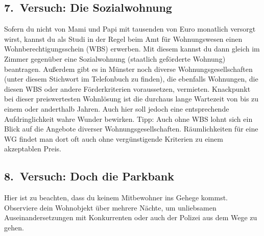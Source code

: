 \begin{multicols*}{2}
\subsection*{7.\ Versuch: Die Sozialwohnung}
Sofern du nicht von Mami und Papi mit tausenden von Euro monatlich versorgt wirst, kannst du als Studi in der Regel beim Amt für Wohnungswesen einen Wohnberechtigungsschein (WBS) erwerben. Mit diesem kannst du dann gleich im Zimmer gegenüber eine Sozialwohnung (staatlich geförderte Wohnung) beantragen. Außerdem gibt es in Münster noch diverse Wohnungsgesellschaften (unter diesem Stichwort im Telefonbuch zu finden), die ebenfalls Wohnungen, die diesen WBS oder andere Förderkriterien voraussetzen, vermieten. Knackpunkt bei dieser preiswertesten Wohnlösung ist die durchaus lange Wartezeit von bis zu einem oder anderthalb Jahren. Auch hier soll jedoch eine entsprechende Aufdringlichkeit wahre Wunder bewirken. Tipp: Auch ohne WBS lohnt sich ein Blick auf die Angebote diverser Wohnungsgesellschaften. Räumlichkeiten für eine WG findet man dort oft auch ohne vergünstigende Kriterien zu einem akzeptablen Preis.

\subsection*{8.\ Versuch: Doch die Parkbank}
Hier ist zu beachten, dass du keinem Mitbewohner ins Gehege kommst. Observiere dein Wohnobjekt über mehrere Nächte, um unliebsamen Auseinandersetzungen mit Konkurrenten oder auch der Polizei aus dem Wege zu gehen.


\end{multicols*}
